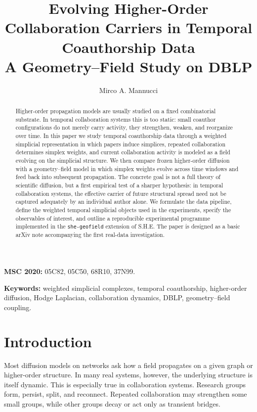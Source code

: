 \documentclass[11pt]{article}
\title{Evolving Higher-Order Collaboration Carriers in Temporal Coauthorship Data\\
A Geometry--Field Study on DBLP}
\author{Mirco A. Mannucci}
\date{}
\begin{document}
\maketitle

\begin{abstract}
Higher-order propagation models are usually studied on a fixed combinatorial substrate. In temporal collaboration systems this is too static: small coauthor configurations do not merely carry activity, they strengthen, weaken, and reorganize over time. In this paper we study temporal coauthorship data through a weighted simplicial representation in which papers induce simplices, repeated collaboration determines simplex weights, and current collaboration activity is modeled as a field evolving on the simplicial structure. We then compare frozen higher-order diffusion with a geometry--field model in which simplex weights evolve across time windows and feed back into subsequent propagation. The concrete goal is not a full theory of scientific diffusion, but a first empirical test of a sharper hypothesis: in temporal collaboration systems, the effective carrier of future structural spread need not be captured adequately by an individual author alone. We formulate the data pipeline, define the weighted temporal simplicial objects used in the experiments, specify the observables of interest, and outline a reproducible experimental programme implemented in the \texttt{she-geofield} extension of S.H.E. The paper is designed as a basic arXiv note accompanying the first real-data investigation.
\end{abstract}

\medskip
\noindent\textbf{MSC 2020:} 05C82, 05C50, 68R10, 37N99.

\noindent\textbf{Keywords:} weighted simplicial complexes, temporal coauthorship, higher-order diffusion, Hodge Laplacian, collaboration dynamics, DBLP, geometry--field coupling.

\section{Introduction}
Most diffusion models on networks ask how a field propagates on a given graph or higher-order structure. In many real systems, however, the underlying structure is itself dynamic. This is especially true in collaboration systems. Research groups form, persist, split, and reconnect. Repeated collaboration may strengthen some small groups, while other groups decay or act only as transient bridges.
\end{document}
